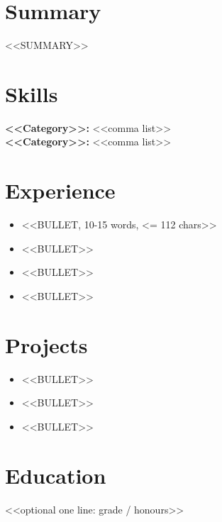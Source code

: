 
\section{Summary}
<<SUMMARY>>

\section{Skills}
\sloppy{}
\textbf{<<Category>>:} <<comma list>>\\
\textbf{<<Category>>:} <<comma list>>

\section{Experience}
\begin{itemize}
  \item <<BULLET, 10-15 words, <= 112 chars>>
  \item <<BULLET>>
  \item <<BULLET>>
  \item <<BULLET>>
\end{itemize}

\section{Projects}
\begin{itemize}
  \item <<BULLET>>
  \item <<BULLET>>
  \item <<BULLET>>
\end{itemize}

\section{Education}
<<optional one line: grade / honours>>


